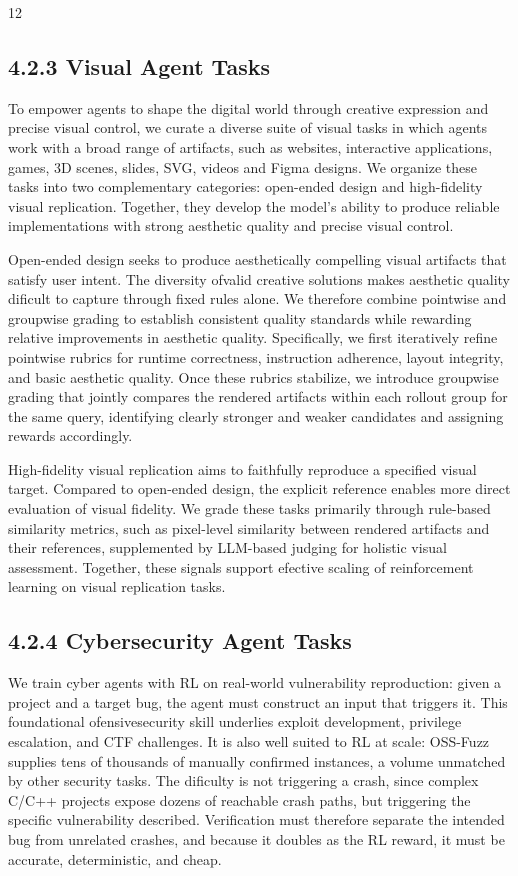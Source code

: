 \documentclass[
  10
]{article}
\begin{document}
12

\subsection{4.2.3 Visual Agent Tasks}\label{visual-agent-tasks}

To empower agents to shape the digital world through creative expression
and precise visual control, we curate a diverse suite of visual tasks in
which agents work with a broad range of artifacts, such as websites,
interactive applications, games, 3D scenes, slides, SVG, videos and
Figma designs. We organize these tasks into two complementary
categories: open-ended design and high-fidelity visual replication.
Together, they develop the model's ability to produce reliable
implementations with strong aesthetic quality and precise visual
control.

Open-ended design seeks to produce aesthetically compelling visual
artifacts that satisfy user intent. The diversity ofvalid creative
solutions makes aesthetic quality dificult to capture through fixed
rules alone. We therefore combine pointwise and groupwise grading to
establish consistent quality standards while rewarding relative
improvements in aesthetic quality. Specifically, we first iteratively
refine pointwise rubrics for runtime correctness, instruction adherence,
layout integrity, and basic aesthetic quality. Once these rubrics
stabilize, we introduce groupwise grading that jointly compares the
rendered artifacts within each rollout group for the same query,
identifying clearly stronger and weaker candidates and assigning rewards
accordingly.

High-fidelity visual replication aims to faithfully reproduce a
specified visual target. Compared to open-ended design, the explicit
reference enables more direct evaluation of visual fidelity. We grade
these tasks primarily through rule-based similarity metrics, such as
pixel-level similarity between rendered artifacts and their references,
supplemented by LLM-based judging for holistic visual assessment.
Together, these signals support efective scaling of reinforcement
learning on visual replication tasks.

\subsection{4.2.4 Cybersecurity Agent
Tasks}\label{cybersecurity-agent-tasks}

We train cyber agents with RL on real-world vulnerability reproduction:
given a project and a target bug, the agent must construct an input that
triggers it. This foundational ofensivesecurity skill underlies exploit
development, privilege escalation, and CTF challenges. It is also well
suited to RL at scale: OSS-Fuzz supplies tens of thousands of manually
confirmed instances, a volume unmatched by other security tasks. The
dificulty is not triggering a crash, since complex C/C++ projects expose
dozens of reachable crash paths, but triggering the specific
vulnerability described. Verification must therefore separate the
intended bug from unrelated crashes, and because it doubles as the RL
reward, it must be accurate, deterministic, and cheap.
\end{document}
